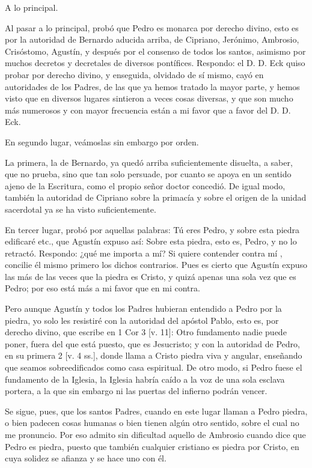 A lo principal.

Al pasar a lo principal, probó que Pedro es monarca por derecho divino, esto es por la autoridad de Bernardo aducida arriba, de Cipriano, Jerónimo, Ambrosio, Crisóstomo, Agustín, y después por el consenso de todos los santos, asimismo por muchos decretos y decretales de diversos pontífices. Respondo: el D. D. Eck quiso probar por derecho divino, y enseguida, olvidado de sí mismo, cayó en autoridades de los Padres, de las que ya hemos tratado la mayor parte, y hemos visto que en diversos lugares sintieron a veces cosas diversas, y que son mucho más numerosos y con mayor frecuencia están a mi favor que a favor del D. D. Eck.

En segundo lugar, veámoslas sin embargo por orden.

La primera, la de Bernardo, ya quedó arriba suficientemente disuelta, a saber, que no prueba, sino que tan solo persuade, por cuanto se apoya en un sentido ajeno de la Escritura, como el propio señor doctor concedió. De igual modo, también la autoridad de Cipriano sobre la primacía y sobre el origen de la unidad sacerdotal ya se ha visto suficientemente.

En tercer lugar, probó por aquellas palabras: Tú eres Pedro, y sobre esta piedra edificaré etc., que Agustín expuso así: Sobre esta piedra, esto es, Pedro, y no lo retractó. Respondo: ¿qué me importa a mí? Si quiere contender contra mí \marginpar{\small[278]}, concilie él mismo primero los dichos contrarios. Pues es cierto que Agustín expuso las más de las veces que la piedra es Cristo, y quizá apenas una sola vez que es Pedro; por eso está más a mi favor que en mi contra.

Pero aunque Agustín y todos los Padres hubieran entendido a Pedro por la piedra, yo solo les resistiré con la autoridad del apóstol Pablo, esto es, por derecho divino, que escribe en 1 Cor 3 [v. 11]: Otro fundamento nadie puede poner, fuera del que está puesto, que es Jesucristo; y con la autoridad de Pedro, en su primera 2 [v. 4 ss.], donde llama a Cristo piedra viva y angular, enseñando que seamos sobreedificados como casa espiritual. De otro modo, si Pedro fuese el fundamento de la Iglesia, la Iglesia habría caído a la voz de una sola esclava portera, a la que sin embargo ni las puertas del infierno podrán vencer.

Se sigue, pues, que los santos Padres, cuando en este lugar llaman a Pedro piedra, o bien padecen cosas humanas o bien tienen algún otro sentido, sobre el cual no me pronuncio. Por eso admito sin dificultad aquello de Ambrosio cuando dice que Pedro es piedra, puesto que también cualquier cristiano es piedra por Cristo, en cuya solidez se afianza y se hace uno con él.

